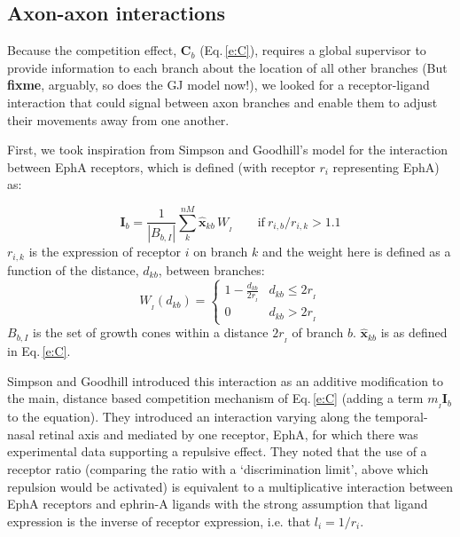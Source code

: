 \documentclass[11pt, a4paper]{article}
\begin{document}
\subsection*{Axon-axon interactions}

Because the competition effect, $\mathbf{C}_b$ (Eq.\,\ref{e:C}), requires a
global supervisor to provide information to each branch about the location of
all other branches (But \textbf{fixme}, arguably, so does the GJ model now!),
we looked for a receptor-ligand interaction that could signal between axon
branches and enable them to adjust their movements away from one another.

First, we took inspiration from Simpson and Goodhill's model for the
interaction between EphA receptors, which is defined (with receptor $r_i$
representing EphA) as:

%
\begin{equation}
\mathbf{I}_b
= \frac{1}{|B_{b,I}|} \sum_k^{nM} \hat{\mathbf{x}}_{kb}\,W_{\!_I} \qquad \mathrm{if}~r_{i,b}
/ r_{i,k} > 1.1
\end{equation}
%
$r_{i,k}$ is the expression of receptor $i$ on branch $k$ and the weight here
is defined as a function of the distance, $d_{kb}$, between branches:
%
\begin{equation}
W_{\!_I}(d_{kb}) = \begin{cases}
      1 - \frac{d_{kb}}{2r_{\!_I}}   & d_{kb} \leq 2r_{\!_I} \\
     0 & d_{kb} > 2r_{\!_I}
     \end{cases}
\end{equation}
%
$B_{b,I}$ is the set of growth cones within a distance $2r_{\!_I}$ of branch
$b$. $\hat{\mathbf{x}}_{kb}$ is as defined in Eq.\,\ref{e:C}.

Simpson and Goodhill introduced this interaction as an additive modification
to the main, distance based competition mechanism of Eq.\,\ref{e:C} (adding a
term $m_{\!_I} \mathbf{I}_b$ to the equation). They introduced an interaction
varying along the temporal-nasal retinal axis and mediated by one receptor,
EphA, for which there was experimental data supporting a repulsive
effect. They noted that the use of a receptor ratio (comparing the ratio with
a `discrimination limit', above which repulsion would be activated) is
equivalent to a multiplicative interaction between EphA receptors and ephrin-A
ligands with the strong assumption that ligand expression is the inverse of
receptor expression, i.e. that $l_i = 1/r_i$.
\end{document}
